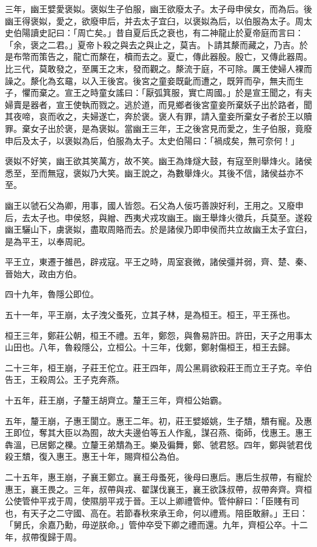\begin{pinyinscope}
三年，幽王嬖愛褒姒。褒姒生子伯服，幽王欲廢太子。太子母申侯女，而為后。後幽王得褒姒，愛之，欲廢申后，并去太子宜臼，以褒姒為后，以伯服為太子。周太史伯陽讀史記曰：「周亡矣。」昔自夏后氏之衰也，有二神龍止於夏帝庭而言曰：「余，褒之二君。」夏帝卜殺之與去之與止之，莫吉。卜請其漦而藏之，乃吉。於是布幣而策告之，龍亡而漦在，櫝而去之。夏亡，傳此器殷。殷亡，又傳此器周。比三代，莫敢發之，至厲王之末，發而觀之。漦流于庭，不可除。厲王使婦人裸而譟之。漦化為玄黿，以入王後宮。後宮之童妾既齔而遭之，既笄而孕，無夫而生子，懼而棄之。宣王之時童女謠曰：「厭弧箕服，實亡周國。」於是宣王聞之，有夫婦賣是器者，宣王使執而戮之。逃於道，而見鄉者後宮童妾所棄妖子出於路者，聞其夜啼，哀而收之，夫婦遂亡，奔於褒。褒人有罪，請入童妾所棄女子者於王以贖罪。棄女子出於褒，是為褒姒。當幽王三年，王之後宮見而愛之，生子伯服，竟廢申后及太子，以褒姒為后，伯服為太子。太史伯陽曰：「禍成矣，無可奈何！」

褒姒不好笑，幽王欲其笑萬方，故不笑。幽王為烽燧大鼓，有寇至則舉烽火。諸侯悉至，至而無寇，褒姒乃大笑。幽王說之，為數舉烽火。其後不信，諸侯益亦不至。

幽王以虢石父為卿，用事，國人皆怨。石父為人佞巧善諛好利，王用之。又廢申后，去太子也。申侯怒，與繒、西夷犬戎攻幽王。幽王舉烽火徵兵，兵莫至。遂殺幽王驪山下，虜褒姒，盡取周賂而去。於是諸侯乃即申侯而共立故幽王太子宜臼，是為平王，以奉周祀。

平王立，東遷于雒邑，辟戎寇。平王之時，周室衰微，諸侯彊并弱，齊、楚、秦、晉始大，政由方伯。

四十九年，魯隱公即位。

五十一年，平王崩，太子洩父蚤死，立其子林，是為桓王。桓王，平王孫也。

桓王三年，鄭莊公朝，桓王不禮。五年，鄭怨，與魯易許田。許田，天子之用事太山田也。八年，魯殺隱公，立桓公。十三年，伐鄭，鄭射傷桓王，桓王去歸。

二十三年，桓王崩，子莊王佗立。莊王四年，周公黑肩欲殺莊王而立王子克。辛伯告王，王殺周公。王子克奔燕。

十五年，莊王崩，子釐王胡齊立。釐王三年，齊桓公始霸。

五年，釐王崩，子惠王閬立。惠王二年。初，莊王嬖姬姚，生子穨，穨有寵。及惠王即位，奪其大臣以為囿，故大夫邊伯等五人作亂，謀召燕、衛師，伐惠王。惠王犇溫，已居鄭之櫟。立釐王弟穨為王。樂及徧舞，鄭、虢君怒。四年，鄭與虢君伐殺王穨，復入惠王。惠王十年，賜齊桓公為伯。

二十五年，惠王崩，子襄王鄭立。襄王母蚤死，後母曰惠后。惠后生叔帶，有寵於惠王，襄王畏之。三年，叔帶與戎、翟謀伐襄王，襄王欲誅叔帶，叔帶奔齊。齊桓公使管仲平戎于周，使隰朋平戎于晉。王以上卿禮管仲。管仲辭曰：「臣賤有司也，有天子之二守國、高在。若節春秋來承王命，何以禮焉。陪臣敢辭。」王曰：「舅氏，余嘉乃勳，毋逆朕命。」管仲卒受下卿之禮而還。九年，齊桓公卒。十二年，叔帶復歸于周。


\end{pinyinscope}
